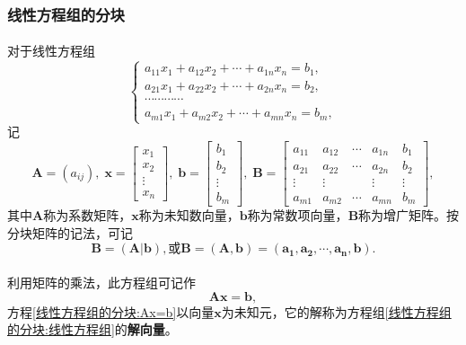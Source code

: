 \subsubsection{线性方程组的分块}
\paragraph{}
对于线性方程组
\begin{equation}
  \label{线性方程组的分块:线性方程组}
  \left\{\begin{array}{l}
    a_{11}x_1 + a_{12}x_2 + \cdots + a_{1n}x_n = b_1, \\
    a_{21}x_1 + a_{22}x_2 + \cdots + a_{2n}x_n = b_2, \\
    \cdots\cdots\cdots\cdots \\
    a_{m1}x_1 + a_{m2}x_2 + \cdots + a_{mn}x_n = b_m,
  \end{array} \right.
\end{equation}
记
\begin{equation*}
  \bm{A} = (a_{ij}), \; \bm{x} = \left[\begin{array}{c}
    x_1 \\
    x_2 \\
    \vdots \\
    x_n
  \end{array}\right], \;
  \bm{b} = \left[\begin{array}{c}
    b_1 \\
    b_2 \\
    \vdots \\
    b_m
  \end{array}\right], \;
  \bm{B} = \left[\begin{array}{cccc|c}
    a_{11} & a_{12} & \cdots & a_{1n} & b_1 \\
    a_{21} & a_{22} & \cdots & a_{2n} & b_2 \\
    \vdots & \vdots & & \vdots & \vdots \\
    a_{m1} & a_{m2} & \cdots & a_{mn} & b_m
  \end{array}\right],
\end{equation*}
其中$\bm{A}$称为系数矩阵，$\bm{x}$称为未知数向量，$\bm{b}$称为常数项向量，$\bm{B}$称为增广矩阵。按分块矩阵的记法，可记
\begin{equation*}
  \bm{B} = (\bm{A}|\bm{b}), \text{或} \bm{B} = (\bm{A},\bm{b}) = (\bm{a_1},\bm{a_2},\cdots,\bm{a_n}, \bm{b}).
\end{equation*}

\paragraph{}
利用矩阵的乘法，此方程组可记作
\begin{equation}
  \label{线性方程组的分块:Ax=b}
  \bm{Ax} = \bm{b},
\end{equation}
方程\eqref{线性方程组的分块:Ax=b}以向量$\bm{x}$为未知元，它的解称为方程组\eqref{线性方程组的分块:线性方程组}的\textbf{解向量}。

